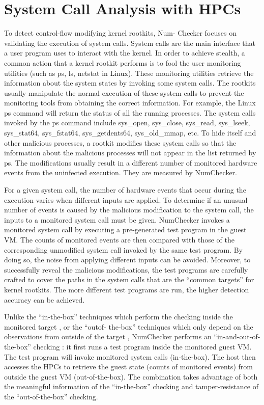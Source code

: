 \documentclass[12pt]{report}
\begin{document}
\section{System Call Analysis with HPCs}
To detect control-flow modifying kernel rootkits, Num-
Checker focuses on validating the execution of system calls.
System calls are the main interface that a user program uses to
interact with the kernel. In order to achieve stealth, a common
action that a kernel rootkit performs is to fool the user monitoring
utilities (such as ps, ls, netstat in Linux). These monitoring
utilities retrieve the information about the system states by
invoking some system calls. The rootkits usually manipulate
the normal execution of these system calls to prevent the
monitoring tools from obtaining the correct information. For
example, the Linux ps command will return the status of all
the running processes. The system calls invoked by the ps
command include sys\_open, sys\_close, sys\_read, sys\_lseek,
sys\_stat64, sys\_fstat64, sys\_getdents64, sys\_old\_mmap, etc. To
hide itself and other malicious processes, a rootkit modifies
these system calls so that the information about the malicious
processes will not appear in the list returned by ps. The
modifications usually result in a different number of monitored
hardware events from the uninfected execution. They are
measured by NumChecker.

For a given system call, the number of hardware events
that occur during the execution varies when different inputs
are applied. To determine if an unusual number of events is
caused by the malicious modification to the system call, the
inputs to a monitored system call must be given. NumChecker
invokes a monitored system call by executing a pre-generated
test program in the guest VM. The counts of monitored events
are then compared with those of the corresponding unmodified
system call invoked by the same test program. By doing
so, the noise from applying different inputs can be avoided.
Moreover, to successfully reveal the malicious modifications,
the test programs are carefully crafted to cover the paths in the
system calls that are the “common targets” for kernel rootkits.
The more different test programs are run, the higher detection
accuracy can be achieved.

Unlike the “in-the-box” techniques which perform the
checking inside the monitored target , or the “outof-
the-box” techniques which only depend on the observations
from outside of the target , NumChecker performs
an “in-and-out-of-the-box” checking :
it first runs a test program inside the monitored guest VM.
The test program will invoke monitored system calls (in-the-box).
The host then accesses the HPCs to retrieve the guest
state (counts of monitored events) from outside the guest VM
(out-of-the-box). The combination takes advantage of both
the meaningful information of the “in-the-box” checking and
tamper-resistance of the “out-of-the-box” checking.
\end{document}
